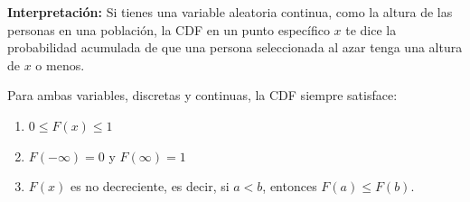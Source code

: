 \documentclass[
  letterpaper,
  DIV=11,
  numbers=noendperiod]{scrartcl}
\providecommand{\tightlist}{%
  \setlength{\itemsep}{0pt}\setlength{\parskip}{0pt}}\usepackage{longtable,booktabs,array}
\begin{document}
\textbf{Interpretación:} Si tienes una variable aleatoria continua, como
la altura de las personas en una población, la CDF en un punto
específico \(x\) te dice la probabilidad acumulada de que una persona
seleccionada al azar tenga una altura de \(x\) o menos.

Para ambas variables, discretas y continuas, la CDF siempre satisface:

\begin{enumerate}
\def\labelenumi{\arabic{enumi}.}
\tightlist
\item
  \(0 \leq F(x) \leq 1\)
\item
  \(F(-\infty) = 0\) y \(F(\infty) = 1\)
\item
  \(F(x)\) es no decreciente, es decir, si \(a < b\), entonces
  \(F(a) \leq F(b)\).
\end{enumerate}
\end{document}
